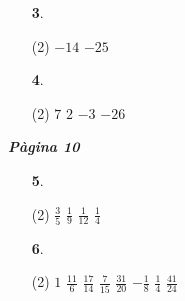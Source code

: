 \documentclass[a4paper, pdf, twoside]{book}
\begin{document}
\begin{multicols}{2}
\begin{enumerate}

 \item[\fontfamily{phv}\selectfont\color{blue}\textbf{3}. ] 
 \begin{tasks}[column-sep=1em, item-indent=1.3333em](2)
	 \task $-14$
	 \task $-25$
\end{tasks}
\vspace{0.25cm}



 \item[\fontfamily{phv}\selectfont\color{blue}\textbf{4}. ]  \scalebox{0.6}{\simbolclau } 
 \begin{tasks}[column-sep=1em, item-indent=1.3333em](2)
	 \task $7$
	 \task $2$
	 \task $-3$
	 \task $-26$
\end{tasks}
 \end{enumerate}
\vspace{0.3cm}


{\textbf{\em Pàgina 10}} \hrulefill
\begin{enumerate}
\vspace{0.25cm}



 \item[\fontfamily{phv}\selectfont\color{blue}\textbf{5}. ]  \scalebox{0.6}{\simbolclau } 
 \begin{tasks}[column-sep=1em, item-indent=1.3333em](2)
	 \task $\frac {3}{5}$
	 \task $\frac {1}{9}$
	 \task $\frac {1}{12}$
	 \task $\frac {1}{4}$
\end{tasks}
 \end{enumerate}
\begin{enumerate}
\vspace{0.25cm}



 \item[\fontfamily{phv}\selectfont\color{blue}\textbf{6}. ]  \scalebox{0.6}{\simbolclau } 
 \begin{tasks}[column-sep=1em, item-indent=1.3333em](2)
	 \task $1$
	 \task $\frac {11}{6}$
	 \task $\frac {17}{14}$
	 \task $\frac {7}{15}$
	 \task $\frac {31}{20}$
	 \task $-\frac {1}{8}$
	 \task $\frac {1}{4}$
	 \task $\frac {41}{24}$
\end{tasks}
 \end{enumerate}
\vspace{0.3cm}



\end{multicols}
\end{document}
